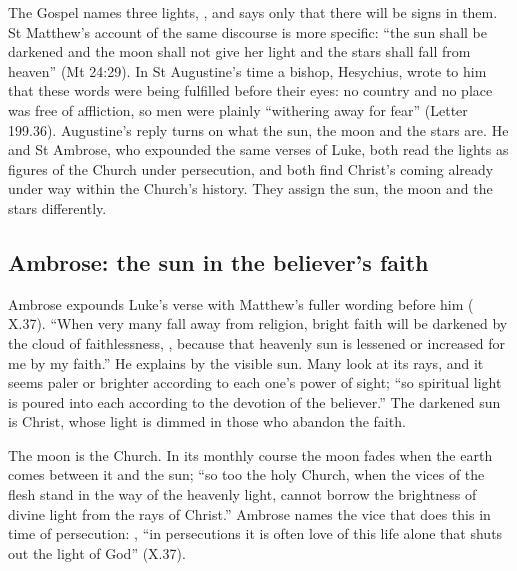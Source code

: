 
The Gospel names three lights, , and says only that
there will be signs in them. St Matthew's account of the same discourse is
more specific: ``the sun shall be darkened and the moon shall not give her
light and the stars shall fall from heaven'' (Mt 24:29). In St Augustine's
time a bishop, Hesychius, wrote to him that these words were being fulfilled
before their eyes: no country and no place was free of affliction, so men
were plainly ``withering away for fear'' (Letter 199.36). Augustine's reply
turns on what the sun, the moon and the stars are. He and St Ambrose, who
expounded the same verses of Luke, both read the lights as figures of the
Church under persecution, and both find Christ's coming already under way
within the Church's history. They assign the sun, the moon and the stars
differently.

\subsection{Ambrose: the sun in the believer's faith}

Ambrose expounds Luke's verse with Matthew's fuller wording before him
( X.37). ``When very many fall away
from religion, bright faith will be darkened by the cloud of
faithlessness, , because that heavenly sun is lessened or increased for me by my
faith.'' He explains by the visible sun. Many look at its rays, and it seems
paler or brighter according to each one's power of sight; ``so spiritual
light is poured into each according to the devotion of the believer.'' The
darkened sun is Christ, whose light is dimmed in those who abandon the faith.

The moon is the Church. In its monthly course the moon fades when the earth
comes between it and the sun; ``so too the holy Church, when the vices of the
flesh stand in the way of the heavenly light, cannot borrow the brightness of
divine light from the rays of Christ.'' Ambrose names the vice that does this
in time of persecution: , ``in persecutions it is often love of this life
alone that shuts out the light of God'' (X.37).

